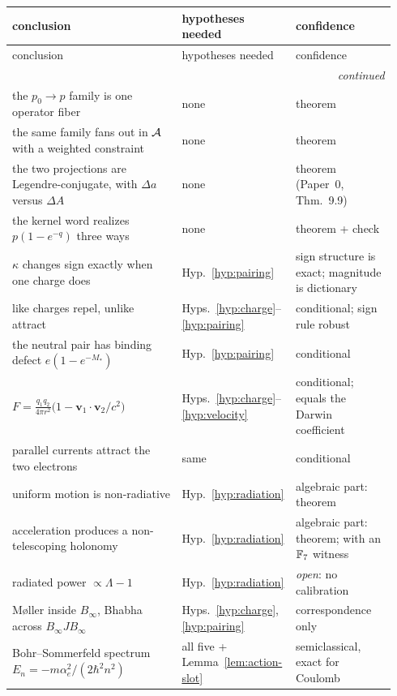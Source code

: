 {\small
\renewcommand{\arraystretch}{1.22}%
\begin{longtable}{@{}p{0.44\linewidth}p{0.24\linewidth}p{0.26\linewidth}@{}}
\toprule
conclusion & hypotheses needed & confidence \\
\midrule
\endfirsthead
\toprule
conclusion & hypotheses needed & confidence \\
\midrule
\endhead
\midrule
\multicolumn{3}{r}{\emph{continued}}\\
\endfoot
\bottomrule
\endlastfoot
the $p_0\to p$ family is one operator fiber & none & theorem \\
the same family fans out in $\mathcal{A}$ with a weighted constraint & none & theorem \\
the two projections are Legendre-conjugate, with $\Delta a$ versus $\Delta A$
& none & theorem (Paper~0, Thm.~9.9) \\
the kernel word realizes $p(1-e^{-q})$ three ways & none & theorem + check \\
$\kappa$ changes sign exactly when one charge does & Hyp.~\ref{hyp:pairing}
& sign structure is exact; magnitude is dictionary \\
like charges repel, unlike attract & Hyps.~\ref{hyp:charge}--\ref{hyp:pairing}
& conditional; sign rule robust \\
the neutral pair has binding defect $e(1-e^{-M_*})$
& Hyp.~\ref{hyp:pairing} & conditional \\
$F=\frac{q_1q_2}{4\pi r^2}\bigl(1-\mathbf v_1\!\cdot\!\mathbf v_2/c^2\bigr)$
& Hyps.~\ref{hyp:charge}--\ref{hyp:velocity} & conditional; equals the Darwin
coefficient \\
parallel currents attract the two electrons & same & conditional \\
uniform motion is non-radiative & Hyp.~\ref{hyp:radiation} & algebraic part: theorem \\
acceleration produces a non-telescoping holonomy & Hyp.~\ref{hyp:radiation}
& algebraic part: theorem; with an $\mathbb{F}_7$ witness \\
radiated power $\propto\Lambda-1$ & Hyp.~\ref{hyp:radiation}
& \emph{open}: no calibration \\
M\o ller inside $B_\infty$, Bhabha across $B_\infty JB_\infty$
& Hyps.~\ref{hyp:charge}, \ref{hyp:pairing} & correspondence only \\
Bohr--Sommerfeld spectrum $E_n=-m\alpha_e^{2}/(2\hbar^{2}n^{2})$
& all five + Lemma~\ref{lem:action-slot} & semiclassical, exact for Coulomb \\
\end{longtable}}

